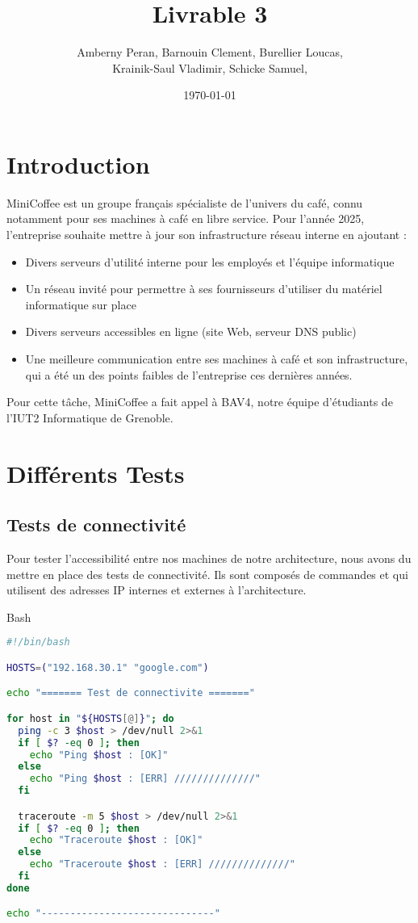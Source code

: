 \documentclass{article}
\title{Livrable 3}
\author{
Amberny Peran, Barnouin Clement, Burellier Loucas, \\
Krainik-Saul Vladimir, Schicke Samuel, 
}
\date{\today}
\begin{document}
\maketitle

\tableofcontents
\clearpage

\section{Introduction}
MiniCoffee est un groupe français spécialiste de l’univers du café, connu notamment pour ses machines à café en libre service. Pour l’année 2025, l’entreprise souhaite mettre à jour son infrastructure réseau interne en ajoutant : 
\begin{itemize}
	\item Divers serveurs d’utilité interne pour les employés et l'équipe informatique
	\item Un réseau invité pour permettre à ses fournisseurs d’utiliser du matériel 		informatique sur place
	\item Divers serveurs accessibles en ligne (site Web, serveur DNS public)
	\item Une meilleure communication entre ses machines à café et son infrastructure, qui a été un des points faibles de l’entreprise ces dernières années.
\end{itemize}
Pour cette tâche, MiniCoffee a fait appel à BAV4, notre équipe d’étudiants de l’IUT2 Informatique de Grenoble.

\section{Différents Tests}
\subsection{Tests de connectivité}

Pour tester l'accessibilité entre nos machines de notre architecture, nous avons du mettre en place des tests de connectivité. Ils sont composés de commandes  et  qui utilisent des adresses IP internes et externes à l'architecture.

\begin{codebox}{Bash}
\begin{lstlisting}[language=Bash]
#!/bin/bash

HOSTS=("192.168.30.1" "google.com")

echo "======= Test de connectivite ======="

for host in "${HOSTS[@]}"; do
  ping -c 3 $host > /dev/null 2>&1
  if [ $? -eq 0 ]; then
    echo "Ping $host : [OK]"
  else
    echo "Ping $host : [ERR] //////////////"
  fi

  traceroute -m 5 $host > /dev/null 2>&1
  if [ $? -eq 0 ]; then
    echo "Traceroute $host : [OK]"
  else
    echo "Traceroute $host : [ERR] //////////////"
  fi
done

echo "------------------------------"
\end{lstlisting}
\end{codebox}
\end{document}
